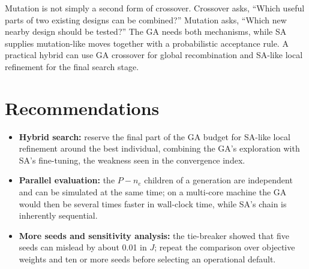 Mutation is not simply a second form of crossover. Crossover asks, ``Which useful parts of two
existing designs can be combined?'' Mutation asks, ``Which new nearby design should be tested?'' The
GA needs both mechanisms, while SA supplies mutation-like moves together with a probabilistic
acceptance rule. A practical hybrid can use GA crossover for global recombination and SA-like local
refinement for the final search stage.

\section{Recommendations}
\label{sec:ga-recommendations}

\begin{itemize}
\item \textbf{Hybrid search:} reserve the final part of the GA budget for SA-like local refinement
around the best individual, combining the \ac{GA}'s exploration with \ac{SA}'s fine-tuning, the
weakness seen in the convergence index.
\item \textbf{Parallel evaluation:} the $P-n_e$ children of a generation are independent and can be
simulated at the same time; on a multi-core machine the \ac{GA} would then be several times faster
in wall-clock time, while \ac{SA}'s chain is inherently sequential.
\item \textbf{More seeds and sensitivity analysis:} the tie-breaker showed that five seeds
can mislead by about 0.01 in $J$; repeat the comparison over objective weights and ten or more seeds
before selecting an operational default.
\end{itemize}
